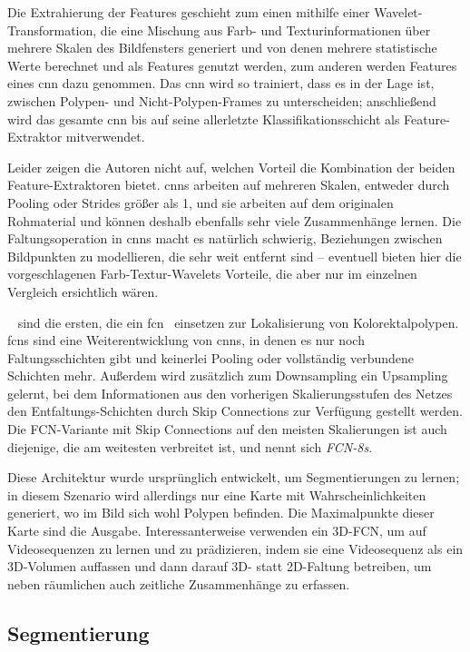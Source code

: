 Die Extrahierung der Features geschieht zum einen mithilfe einer Wavelet-Transformation, die eine Mischung aus Farb- und Texturinformationen über mehrere Skalen des Bildfensters generiert und von denen mehrere statistische Werte berechnet und als Features genutzt werden, zum anderen werden Features eines \gls{cnn} dazu genommen.
Das \gls{cnn} wird so trainiert, dass es in der Lage ist, zwischen Polypen- und Nicht-Polypen-Frames zu unterscheiden; anschließend wird das gesamte \gls{cnn} bis auf seine allerletzte Klassifikationsschicht als Feature-Extraktor mitverwendet.

Leider zeigen die Autoren nicht auf, welchen Vorteil die Kombination der beiden Feature-Extraktoren bietet.
\glspl{cnn} arbeiten auf mehreren Skalen, entweder durch Pooling oder Strides größer als 1, und sie arbeiten auf dem originalen Rohmaterial und können deshalb ebenfalls sehr viele Zusammenhänge lernen.
Die Faltungsoperation in \glspl{cnn} macht es natürlich schwierig, Beziehungen zwischen Bildpunkten zu modellieren, die sehr weit entfernt sind -- eventuell bieten hier die vorgeschlagenen Farb-Textur-Wavelets Vorteile, die aber nur im einzelnen Vergleich ersichtlich wären.

\citeauthor{Lequan.2017}~\cite{Lequan.2017} sind die ersten, die ein \gls{fcn}~\cite{Long.2015} einsetzen zur Lokalisierung von Kolorektalpolypen.
\glspl{fcn} sind eine Weiterentwicklung von \glspl{cnn}, in denen es nur noch Faltungsschichten gibt und keinerlei Pooling oder vollständig verbundene Schichten mehr.
Außerdem wird zusätzlich zum Downsampling ein Upsampling gelernt, bei dem Informationen aus den vorherigen Skalierungsstufen des Netzes den Entfaltungs-Schichten durch Skip Connections zur Verfügung gestellt werden.
Die FCN-Variante mit Skip Connections auf den meisten Skalierungen ist auch diejenige, die am weitesten verbreitet ist, und nennt sich \emph{FCN-8s}.

Diese Architektur wurde ursprünglich entwickelt, um Segmentierungen zu lernen; in diesem Szenario wird allerdings nur eine Karte mit Wahrscheinlichkeiten generiert, wo im Bild sich wohl Polypen befinden.
Die Maximalpunkte dieser Karte sind die Ausgabe.
Interessanterweise verwenden \citeauthor{Lequan.2017} ein 3D-FCN, um auf Videosequenzen zu lernen und zu prädizieren, indem sie eine Videosequenz als ein 3D-Volumen auffassen und dann darauf 3D- statt 2D-Faltung betreiben, um neben räumlichen auch zeitliche Zusammenhänge zu erfassen.



\subsection{Segmentierung}

